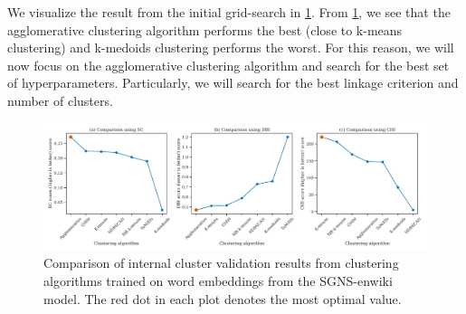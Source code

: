 We visualize the result from the initial grid-search in \cref{fig:cluster-analysis-comparison-internal-cluster-validation}. From \cref{fig:cluster-analysis-comparison-internal-cluster-validation}, we see that the agglomerative clustering algorithm performs the best (close to k-means clustering) and k-medoids clustering performs the worst. For this reason, we will now focus on the agglomerative clustering algorithm and search for the best set of hyperparameters. Particularly, we will search for the best linkage criterion and number of clusters.
\begin{figure}[H]
    \centering
    \includegraphics[width=\textwidth]{thesis/figures/cluster-analysis-comparison-internal-cluster-validation.pdf}
    \caption{Comparison of internal cluster validation results from clustering algorithms trained on word embeddings from the SGNS-enwiki model. The red dot in each plot denotes the most optimal value.}
    \label{fig:cluster-analysis-comparison-internal-cluster-validation}
\end{figure}

